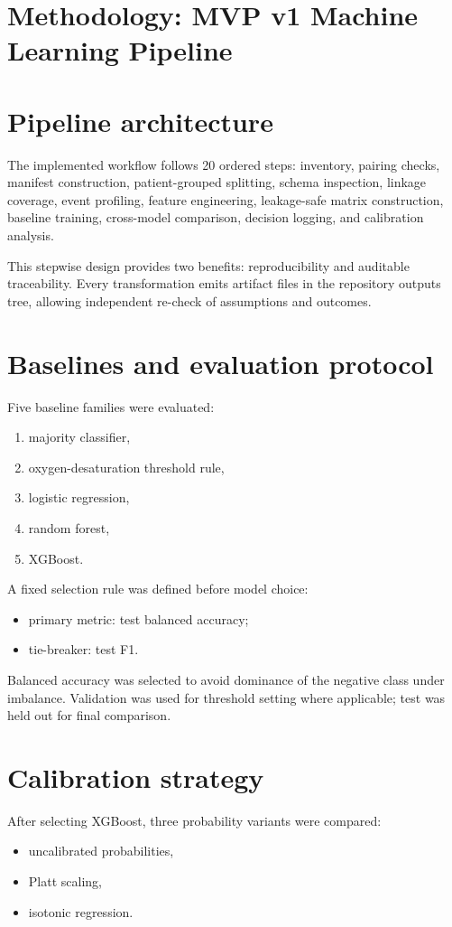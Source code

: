 \documentclass[10pt,a4paper,twocolumn]{article}
\newcommand{\chapter}[1]{\section{#1}}
\begin{document}
\chapter{Methodology: MVP v1 Machine Learning Pipeline}
\section{Pipeline architecture}
The implemented workflow follows 20 ordered steps: inventory, pairing checks, manifest construction, patient-grouped splitting, schema inspection, linkage coverage, event profiling, feature engineering, leakage-safe matrix construction, baseline training, cross-model comparison, decision logging, and calibration analysis.

This stepwise design provides two benefits: reproducibility and auditable traceability. Every transformation emits artifact files in the repository outputs tree, allowing independent re-check of assumptions and outcomes.

\section{Baselines and evaluation protocol}
Five baseline families were evaluated:
\begin{enumerate}[leftmargin=1.2cm]
    \item majority classifier,
    \item oxygen-desaturation threshold rule,
    \item logistic regression,
    \item random forest,
    \item XGBoost.
\end{enumerate}

A fixed selection rule was defined before model choice:
\begin{itemize}[leftmargin=1.2cm]
    \item primary metric: test balanced accuracy;
    \item tie-breaker: test F1.
\end{itemize}

Balanced accuracy was selected to avoid dominance of the negative class under imbalance. Validation was used for threshold setting where applicable; test was held out for final comparison.

\section{Calibration strategy}
After selecting XGBoost, three probability variants were compared:
\begin{itemize}[leftmargin=1.2cm]
    \item uncalibrated probabilities,
    \item Platt scaling,
    \item isotonic regression.
\end{itemize}
\end{document}
